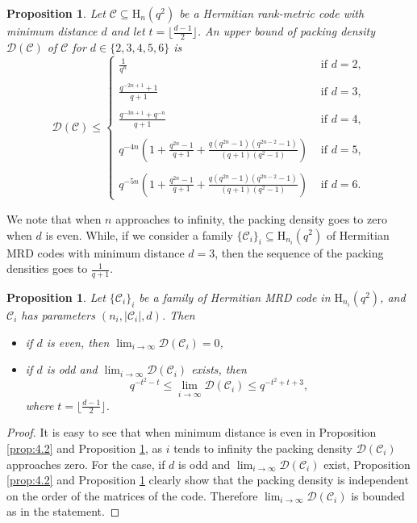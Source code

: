 \documentclass[12pt,a4paper]{article}
\newtheorem{proposition}[theorem]{Proposition}
\begin{document}
\begin{proposition}\label{prop:cvd}
    Let $\mathscr{C}\subseteq \mathrm{H}_{n}(q^2)$ be a Hermitian rank-metric code with minimum distance $d$ and let $t=\lfloor \frac{d-1}{2}\rfloor$. An upper bound of {packing density} $\mathscr{D}(\mathscr{C})$ of $\mathscr{C}$ for $d\in\{2,3,4,5,6\}$ is
    \[\mathscr{D(C)}\leq \begin{cases}
        \frac{1}{q^n} &\text{ if } d=2,\\
        \\
        \frac{q^{-2n+1}+1}{q+1}&\text{ if } d=3,\\
        \\
       \frac{q^{-3n+1}+q^{-n}}{q+1}  &\text{ if } d=4,\\
       \\
        q^{-4n}\left(1+\frac{q^{2n}-1}{q+1}+\frac{q(q^{2n}-1)(q^{2n-2}-1)}{(q+1)(q^2-1)}\right) &\text{ if } d=5,\\
        \\
         q^{-5n} \left(1+\frac{q^{2n}-1}{q+1}+\frac{q(q^{2n}-1)(q^{2n-2}-1)}{(q+1)(q^2-1)}\right) &\text{ if } d=6.
    \end{cases}\]
\end{proposition}
 We note that when $n$ approaches to infinity, the {packing density} goes to zero when  $d$ is even. While, if we consider a family $\{\mathscr{C}_i\}_i\subseteq\mathrm{H}_{n_i}(q^2)$ of Hermitian MRD codes with minimum distance $d=3$, then the sequence of the packing densities goes to $\frac{1}{q+1}$.
 
 \begin{proposition}
     Let $\{\mathscr{C}_i\}_i$ be a family of Hermitian MRD code in $\mathrm{H}_{n_i}(q^2)$, and $\mathscr{C}_i$ has parameters $(n_i,|\mathscr{C}_i|,d)$. Then
     \begin{itemize}
         \item if $d$ is even, then $\lim_{i\to\infty} \mathscr{D}(\mathscr{C}_i)=0$,
         \item if $d$ is odd and $\lim_{i\to\infty} \mathscr{D}(\mathscr{C}_i)$ exists, then 
         \[ q^{-t^2-t}\leq\lim_{i\to\infty} \mathscr{D}(\mathscr{C}_i)\leq q^{-t^2+t+3},\]
         where $t=\lfloor\frac{d-1}{2}\rfloor$.
     \end{itemize}
 \end{proposition}
 \begin{proof}
     It is easy to see that when minimum distance is even in Proposition \ref{prop:4.2} and Proposition \ref{prop:cvd}, as $i$ tends to infinity the {packing density} $\mathscr{D}(\mathscr{C}_i)$ approaches zero. For the case, if $d$ is odd and $\lim_{i\to\infty} \mathscr{D}(\mathscr{C}_i)$ exist, Proposition \ref{prop:4.2} and Proposition \ref{prop:cvd} clearly show that the {packing density} is independent on the order of the matrices of the code. Therefore $\lim_{i\to\infty} \mathscr{D}(\mathscr{C}_i)$ is bounded as in the statement.
 \end{proof}
\end{document}
